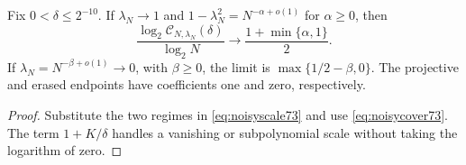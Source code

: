 \begin{corollary}\label{cor:noisyexponents73}
Fix $0<\delta\le2^{-10}$. If $\lambda_N\to1$ and
$1-\lambda_N^2=N^{-\alpha+o(1)}$ for $\alpha\ge0$, then
\[
 \frac{\log_2\mathcal C_{N,\lambda_N}(\delta)}{\log_2N}
                       \longrightarrow\frac{1+\min\{\alpha,1\}}2.
\]
If $\lambda_N=N^{-\beta+o(1)}\to0$, with $\beta\ge0$, the limit is
$\max\{1/2-\beta,0\}$. The projective and erased endpoints have
coefficients one and zero, respectively.
\end{corollary}
\begin{proof}
Substitute the two regimes in \eqref{eq:noisyscale73} and use
\eqref{eq:noisycover73}. The term $1+K/\delta$ handles a vanishing
or subpolynomial scale without taking the logarithm of zero.
\end{proof}

